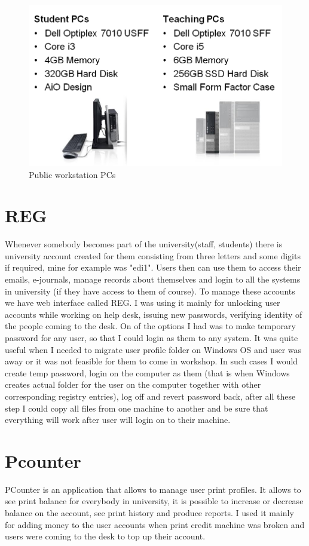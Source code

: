 \documentclass[10pt,a4paper,headinclude=true]{report}
\begin{document}
\begin{figure}[H]
\centering
\centerline{\includegraphics[scale=0.5]{./PSVs}}
\caption{Public workstation PCs \cite{PSVs}}
\label{fig:PSVs}
\end{figure}

\section{REG}
Whenever somebody becomes part of the university(staff, students) there is university account created for them consisting from three letters and some digits if required, mine for example was "edi1". Users then can use them to access their emails, e-journals, manage records about themselves and login to all the systems in university (if they have access to them of course). To manage these accounts we have web interface called REG. I was using it mainly for unlocking user accounts while working on help desk, issuing new passwords, verifying identity of the people coming to the desk. On of the options I had was to make temporary password for any user, so that I could login as them to any system. It was quite useful when I needed to migrate user profile folder on Windows OS and user was away or it was not feasible for them to come in workshop. In such cases I would create temp password, login on the computer as them (that is when Windows creates actual folder for the user on the computer together with other corresponding registry entries), log off and revert password back, after all these step I could copy all files from one machine to another and be sure that everything will work after user will login on to their machine.

\section{Pcounter}
PCounter is an application that allows to  manage user print profiles. It allows to see print balance for everybody in university, it is possible to increase or decrease balance on the account, see print history and produce reports. I used it mainly for adding money to the user accounts when print credit machine was broken and users were coming to the desk to top up their account.
\end{document}
